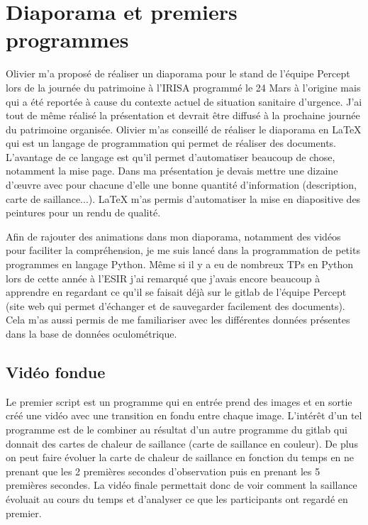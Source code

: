 \chapter{Diaporama et premiers programmes}

\par
Olivier m'a proposé de réaliser un diaporama pour le stand de l'équipe Percept lors de la journée du patrimoine à l'IRISA programmé le 24 Mars à l'origine mais qui a été reportée à cause du contexte actuel de situation sanitaire d'urgence. J'ai tout de même réalisé la présentation et devrait être diffusé à la prochaine journée du patrimoine organisée. Olivier m'as conseillé de réaliser le diaporama en \LaTeX{} qui est un langage de programmation qui permet de réaliser des documents. L'avantage de ce langage est qu'il permet d'automatiser beaucoup de chose, notamment la mise page. Dans ma présentation je devais mettre une dizaine d'\oe{}uvre avec pour chacune d'elle une bonne quantité d'information (description, carte de saillance...). \LaTeX{} m'as permis d'automatiser la mise en diapositive des peintures pour un rendu de qualité.


\par
Afin de rajouter des animations dans mon diaporama, notamment des vidéos pour faciliter la compréhension, je me suis lancé dans la programmation de petits programmes en langage Python. Même si il y a eu de nombreux TPs en Python lors de cette année à l'ESIR j'ai remarqué que j'avais encore beaucoup à apprendre en regardant ce qu'il se faisait déjà sur le gitlab de l'équipe Percept (site web qui permet d'échanger et de sauvegarder facilement des documents). Cela m'as aussi permis de me familiariser avec les différentes données présentes dans la base de données oculométrique.

\section{Vidéo fondue}

Le premier script est un programme qui en entrée prend des images et en sortie créé une vidéo avec une transition en fondu entre chaque image. L'intérêt d'un tel programme est de le combiner au résultat d'un autre programme du gitlab qui donnait des cartes de chaleur de saillance (carte de saillance en couleur). De plus on peut faire évoluer la carte de chaleur de saillance en fonction du temps en ne prenant que les 2 premières secondes d'observation puis en prenant les 5 premières secondes. La vidéo finale permettait donc de voir comment la saillance évoluait au cours du temps et d'analyser ce que les participants ont regardé en premier.




